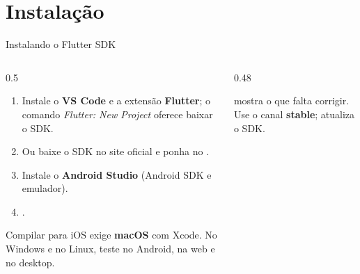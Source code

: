 \documentclass[aspectratio=169,10pt]{beamer}
\begin{document}
\section{Instalação}

\begin{frame}[fragile]{Instalando o Flutter SDK}
  \begin{columns}[T]
    \begin{column}{0.5\textwidth}
      \begin{enumerate}
        \item Instale o \textbf{VS Code} e a extensão \textbf{Flutter}; o comando \emph{Flutter: New Project} oferece baixar o SDK.
        \item Ou baixe o SDK no site oficial e ponha  no .
        \item Instale o \textbf{Android Studio} (Android SDK e emulador).
        \item {}.
      \end{enumerate}
      \begin{atencao}[iOS]
        Compilar para iOS exige \textbf{macOS} com Xcode. No Windows e no Linux, teste no Android, na web e no desktop.
      \end{atencao}
    \end{column}
    \begin{column}{0.48\textwidth}
      \begin{dica}
         mostra o que falta corrigir. Use o canal \textbf{stable};  atualiza o SDK.
      \end{dica}
    \end{column}
  \end{columns}
\end{frame}
\end{document}

